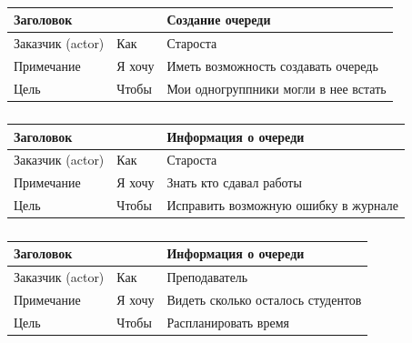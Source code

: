 \begin{table}[h!tp]
    \centering
    \caption{}
    \label{table:user_story:create}
    \begin{tabular}{|l|l|l|}
        \hline \multicolumn{2}{|l|}{Заголовок} & Создание очереди\\ \hline
        Заказчик (actor) & Как & Староста \\ \hline
        Примечание & Я хочу & Иметь возможность создавать очередь\\ \hline
        Цель & Чтобы & Мои одногруппники могли в нее встать\\ \hline
    \end{tabular}
\end{table}
\begin{table}[h!tp]
    \centering
    \caption{}
    \label{table:user_story:info:elder}
    \begin{tabular}{|l|l|l|}
        \hline \multicolumn{2}{|l|}{Заголовок} & Информация о очереди\\ \hline
        Заказчик (actor) & Как & Староста \\ \hline
        Примечание & Я хочу & Знать кто сдавал работы\\ \hline
        Цель & Чтобы & Исправить возможную ошибку в журнале\\ \hline
    \end{tabular}
\end{table}
\begin{table}[h!tp]
    \centering
    \caption{}
    \label{table:user_story:info:teacher}
    \begin{tabular}{|l|l|l|}
        \hline \multicolumn{2}{|l|}{Заголовок} & Информация о очереди\\ \hline
        Заказчик (actor) & Как & Преподаватель \\ \hline
        Примечание & Я хочу & Видеть сколько осталось студентов\\ \hline
        Цель & Чтобы & Распланировать время\\ \hline
    \end{tabular}
\end{table}

